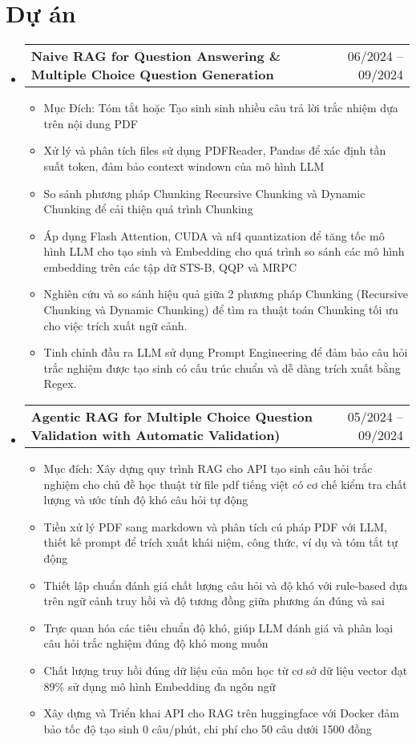 \documentclass[letterpaper,11pt]{article}
\makeatletter
\newcommand{\resumeItem}[1]{
	\item\small{
	{#1 \vspace{-2pt}}
	}
}
\newcommand{\resumeProjectHeading}[2]{
	\item
	\begin{tabular*}{0.97\textwidth}{l@{\extracolsep{\fill}}r}
		\small#1 & #2 \\
	\end{tabular*}\vspace{-7pt}
}
\newcommand{\resumeSubHeadingListStart}{\begin{itemize}[leftmargin=0.15in, label={}]}
\newcommand{\resumeSubHeadingListEnd}{\end{itemize}}
\newcommand{\resumeItemListStart}{\begin{itemize}}
\newcommand{\resumeItemListEnd}{\end{itemize}\vspace{-5pt}}
\makeatother
\begin{document}
\section{Dự án}
	\resumeSubHeadingListStart
		\resumeProjectHeading %
			{\textbf{Naive RAG for Question Answering \& Multiple Choice Question Generation}}{06/2024 -- 09/2024}
			\resumeItemListStart
			\resumeItem{Mục Đích: Tóm tắt hoặc Tạo sinh sinh nhiều câu trả lời trắc nhiệm dựa trên nội dung PDF}
			\resumeItem{Xử lý và phân tích files sử dụng PDFReader, Pandas để xác định tần suất token, đảm bảo context windown của mô hình LLM}
			\resumeItem{So sánh phương pháp Chunking Recursive Chunking và Dynamic Chunking để cải thiện quá trình Chunking}
			\resumeItem{Áp dụng Flash Attention, CUDA và nf4 quantization để tăng tốc mô hình LLM cho tạo sinh và Embedding cho quá trình so sánh các mô hình embedding trên các tập dữ STS-B, QQP và MRPC}
			\resumeItem{Nghiên cứu và so sánh hiệu quả giữa 2 phương pháp Chunking (Recursive Chunking và Dynamic Chunking) để tìm ra thuật toán Chunking tối ưu cho việc trích xuất ngữ cảnh.}
			\resumeItem{Tinh chỉnh đầu ra LLM sử dụng Prompt Engineering để đảm bảo câu hỏi trắc nghiệm được tạo sinh có cấu trúc chuẩn và dễ dàng trích xuất bằng Regex.}
			\resumeItemListEnd

		\resumeProjectHeading
		        {\textbf{Agentic RAG for Multiple Choice Question Validation with Automatic Validation)}}{05/2024 -- 09/2024}
	            	 \resumeItemListStart
		            \resumeItem{Mục đích: Xây dựng quy trình RAG cho API tạo sinh câu hỏi trắc nghiệm cho chủ đề học thuật từ file pdf tiếng việt có cơ chế kiểm tra chất lượng và ước tính độ khó câu hỏi tự động}
 		            \resumeItem{Tiền xử lý PDF sang markdown và phân tích cú pháp PDF với LLM, thiết kế prompt để trích xuất khái niệm, công thức, ví dụ và tóm tắt tự động}
			  \resumeItem{Thiết lập chuẩn đánh giá chất lượng câu hỏi và độ khó với rule-based dựa trên ngữ cảnh truy hồi và độ tương đồng giữa phương án đúng và sai}
 		            \resumeItem{Trực quan hóa các tiêu chuẩn độ khó, giúp LLM đánh giá và phân loại câu hỏi trắc nghiệm đúng độ khó mong muốn}
 		            \resumeItem{Chất lượng truy hồi đúng dữ liệu của môn học từ cơ sở dữ liệu vector đạt 89\% sử dụng mô hình Embedding đa ngôn ngữ}
		            \resumeItem{Xây dựng và Triển khai API cho RAG trên huggingface với Docker đảm bảo tốc độ tạo sinh 0 câu/phút, chi phí cho 50 câu dưới 1500 đồng}
	\resumeItemListEnd
	\resumeSubHeadingListEnd
\end{document}
